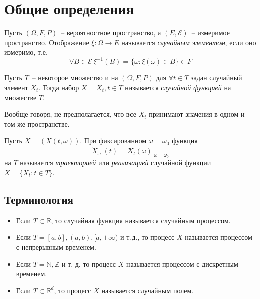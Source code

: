 \section*{Общие определения}

\begin{definition}
Пусть $(\Omega, F, P)$~-- вероятностное пространство, а $(E, \mathcal{E})$~-- измеримое пространство.
Отображение $\xi: \Omega \rightarrow E$ называется \emph{случайным элементом}, если оно измеримо,
т.е. $$\forall B \in \mathcal{E}\ \xi^{-1}(B) = \{\omega: \xi(\omega) \in B\} \in F$$
\end{definition}

\begin{definition}
Пусть $T$~-- некоторое множество и на $(\Omega, F,P)$ для $\forall t \in T$ задан случайный элемент $X_t$. Тогда набор $X = {X_t, t \in T}$ называется \emph{случайной функцией} на множестве $T$.
\end{definition}

\begin{remark}
Вообще говоря, не предполагается, что все $X_t$ принимают значения в одном и том же пространстве.
\end{remark}

\begin{definition}
Пусть $X = (X(t, \omega))$. При фиксированном $\omega = \omega_0$ функция
$$\tilde{X}_{\omega_0}(t) = X_t(\omega) \vert _{\omega = \omega_0}$$
на $T$ называется \emph{траекторией} или \emph{реализацией} случайной функции $X = \{X_t : t \in T\}$.
\end{definition}

\subsection{Терминология}

\begin{itemize}
\item Если $T \subset \mathbb{R}$, то случайная функция называется случайным процессом.
\item Если $T = [a, b], (a, b), [a, +\infty)$ и т.д., то процесс $X$ называется процессом с непрерывным временем.
\item Если $T = \mathbb{N}, \mathbb{Z}$ и т. д. то процесс $X$ называется процессом с дискретным временем.
\item Если $T \subset \mathbb{R}^d$, то процесс $X$ называется случайным полем.
\end{itemize}


